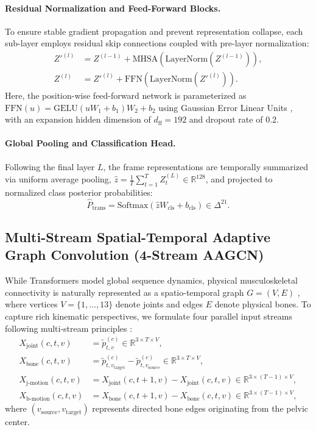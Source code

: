 \documentclass[runningheads]{llncs}
\begin{document}
\paragraph{Residual Normalization and Feed-Forward Blocks.} To ensure stable gradient propagation and prevent representation collapse, each sub-layer employs residual skip connections coupled with pre-layer normalization:
\begin{align}
    Z'^{(l)} &= Z^{(l-1)} + \mathrm{MHSA}\left(\mathrm{LayerNorm}(Z^{(l-1)})\right), \\
    Z^{(l)}  &= Z'^{(l)} + \mathrm{FFN}\left(\mathrm{LayerNorm}(Z'^{(l)})\right).
\end{align}
Here, the position-wise feed-forward network is parameterized as $\mathrm{FFN}(u) = \mathrm{GELU}(u W_1 + b_1) W_2 + b_2$ using Gaussian Error Linear Units \cite{hendrycks2016}, with an expansion hidden dimension of $d_{\text{ff}} = 192$ and dropout rate of 0.2.

\paragraph{Global Pooling and Classification Head.} Following the final layer $L$, the frame representations are temporally summarized via uniform average pooling, $\hat{z} = \frac{1}{T} \sum_{t=1}^T Z_t^{(L)} \in \mathbb{R}^{128}$, and projected to normalized class posterior probabilities:
\begin{equation}
    \hat{P}_{\text{trans}} = \mathrm{Softmax}\left( \hat{z} W_{\text{cls}} + b_{\text{cls}} \right) \in \Delta^{21}.
\end{equation}

\subsection{Multi-Stream Spatial-Temporal Adaptive Graph Convolution (4-Stream AAGCN)}
While Transformers model global sequence dynamics, physical musculoskeletal connectivity is naturally represented as a spatio-temporal graph $G = (V, E)$ \cite{yan2018}, where vertices $V = \{1, \dots, 13\}$ denote joints and edges $E$ denote physical bones. To capture rich kinematic perspectives, we formulate four parallel input streams following multi-stream principles \cite{shi2019two,shi2020skeleton}:
\begin{align}
    X_{\text{joint}}(c, t, v) &= \tilde{p}_{t, v}^{(c)} \in \mathbb{R}^{3 \times T \times V}, \\
    X_{\text{bone}}(c, t, v) &= \tilde{p}_{t, v_{\text{target}}}^{(c)} - \tilde{p}_{t, v_{\text{source}}}^{(c)} \in \mathbb{R}^{3 \times T \times V}, \\
    X_{\text{j-motion}}(c, t, v) &= X_{\text{joint}}(c, t+1, v) - X_{\text{joint}}(c, t, v) \in \mathbb{R}^{3 \times (T-1) \times V}, \\
    X_{\text{b-motion}}(c, t, v) &= X_{\text{bone}}(c, t+1, v) - X_{\text{bone}}(c, t, v) \in \mathbb{R}^{3 \times (T-1) \times V},
\end{align}
where $(v_{\text{source}}, v_{\text{target}})$ represents directed bone edges originating from the pelvic center.
\end{document}
